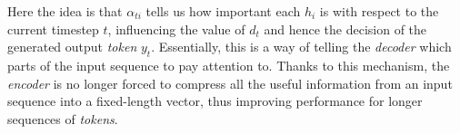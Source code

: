 Here the idea is that $\alpha_{ti}$ tells us how important each $h_i$ is with respect to the current timestep $t$, influencing the value of $d_t$ and hence the decision of the generated output \textit{token} $y_t$. Essentially, this is a way of telling the \textit{decoder} which parts of the input sequence to pay attention to. Thanks to this mechanism, the \textit{encoder} is no longer forced to compress all the useful information from an input sequence into a fixed-length vector, thus improving performance for longer sequences of \textit{tokens}. \cite{bahdanau_neural_2016}